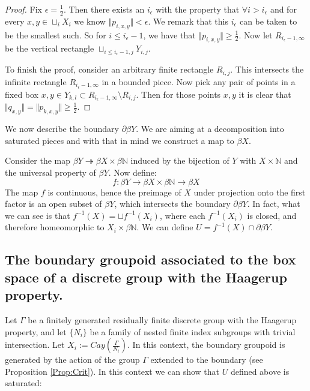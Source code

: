 \begin{example}
\begin{proof}
Fix $\epsilon = \frac{1}{2}$. Then there exists an $i_{\epsilon}$ with the property that $\forall i>i_{\epsilon}$ and for every $x,y \in \sqcup_{i}X_{i}$ we know $\Vert p_{i,x,y} \Vert < \epsilon$. We remark that this $i_{\epsilon}$ can be taken to be the smallest such. So for $i \leq i_{\epsilon}-1$, we have that $\Vert p_{i,x,y} \Vert \geq \frac{1}{2}$. Now let $R_{i_{\epsilon}-1,\infty}$ be the vertical rectangle $\sqcup_{i\leq i_{\epsilon}-1,j} Y_{i,j}$. 

To finish the proof, consider an arbitrary finite rectangle $R_{i,j}$. This intersects the infinite rectangle $R_{i_{\epsilon}-1,\infty}$ in a bounded piece. Now pick any pair of points in a fixed box $x,y \in Y_{k,l} \subset R_{i_{\epsilon}-1,\infty} \setminus R_{i,j}$. Then for those points $x,y$ it is clear that $\Vert q_{x,y} \Vert = \Vert p_{k,x,y}\Vert \geq \frac{1}{2}$.
\end{proof}

We now describe the boundary $\partial\beta Y$. We are aiming at a decomposition into saturated pieces and with that in mind we construct a map to $\beta X$.

Consider the map $\beta Y \twoheadrightarrow \beta X \times \beta \mathbb{N}$ induced by the bijection of $Y$ with $X \times \mathbb{N}$ and the universal property of $\beta Y$. Now define:
\begin{equation*}
f: \beta Y \rightarrow \beta X \times \beta \mathbb{N} \rightarrow \beta X
\end{equation*}
The map $f$ is continuous, hence the preimage of $X$ under projection onto the first factor is an open subset of $\beta Y$, which intersects the boundary $\partial \beta Y$. In fact, what we can see is that $f^{-1}(X)= \sqcup f^{-1}(X_{i})$, where each $f^{-1}(X_{i})$ is closed, and therefore homeomorphic to $X_{i} \times \beta \mathbb{N}$. We can define $U = f^{-1}(X)\cap \partial\beta Y$.

\subsection{The boundary groupoid associated to the box space of a discrete group with the Haagerup property.}

Let $\Gamma$ be a finitely generated residually finite discrete group with the Haagerup property, and let $\lbrace N_{i}\rbrace$ be a family of nested finite index subgroups with trivial intersection. Let $X_{i}:=Cay(\frac{\Gamma}{N_{i}})$. In this context, the boundary groupoid is generated by the action of the group $\Gamma$ extended to the boundary (see Proposition \ref{Prop:Crit}). In this context we can show that $U$ defined above is saturated:


\end{example}
